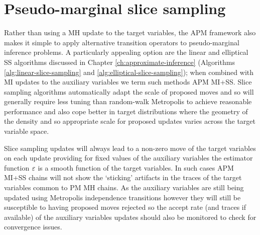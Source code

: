 
\section{Pseudo-marginal slice sampling}

Rather than using a \ac{MH} update to the target variables, the \ac{APM} framework also makes it simple to apply alternative transition operators to pseudo-marginal inference problems. A particularly appealing option are the linear and elliptical \ac{SS} algorithms discussed in Chapter \ref{ch:approximate-inference} (Algorithms \ref{alg:linear-slice-sampling} and \ref{alg:elliptical-slice-sampling}); when combined with \ac{MI} updates to the auxiliary variables we term such methods \ac{APM} \ac{MI}+\ac{SS}. Slice sampling algorithms automatically adapt the scale of proposed moves and so will generally require less tuning than random-walk Metropolis to achieve reasonable performance and also cope better in target distributions where the geometry of the density and so appropriate scale for proposed updates varies across the target variable space.

Slice sampling updates will always lead to a non-zero move of the target variables on each update providing for fixed values of the auxiliary variables the estimator function $\varepsilon$ is a smooth function of the target variables. In such cases \ac{APM} \ac{MI}+\ac{SS} chains will not show the `sticking' artifacts in the traces of the target variables common to \ac{PM} \ac{MH} chains. As the auxiliary variables are still being updated using Metropolis independence transitions however they will still be susceptible to having proposed moves rejected so the accept rate (and traces if available) of the auxiliary variables updates should also be monitored to check for convergence issues. %
	
